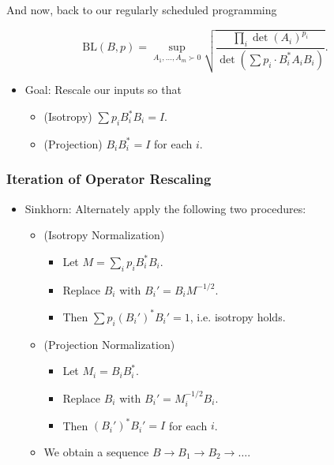\documentclass[usenames,dvipsnames,12pt]{beamer}
\begin{document}
\begin{frame}

And now, back to our regularly scheduled programming

\[ \text{BL}(B,p) = \sup_{A_1,\dots,A_m \succ 0} \sqrt{ \frac{\prod_i \det(A_i)^{p_i}}{\det(\sum p_i \cdot B_i^* A_i B_i)}}. \]

\begin{itemize}
    \pause
    \item Goal: Rescale our inputs so that
    \begin{itemize}
        \pause
        \item (Isotropy) $\sum p_i B_i^* B_i = I$.
        
        \pause
        \item (Projection) $B_i B_i^* = I$ for each $i$.
    \end{itemize}

\end{itemize}

\end{frame}


\begin{frame}
    \frametitle{Iteration of Operator Rescaling}

    \begin{itemize}
    \item Sinkhorn: Alternately apply the following two procedures:
    \begin{itemize}
        \pause
        \item (Isotropy Normalization)
        \begin{itemize}
            \pause
            \item Let $M = \sum_i p_i B_i^* B_i$.
            \pause
            \item Replace $B_i$ with $B_i' = B_i M^{-1/2}$.
            \pause
            \item Then $\sum p_i (B_i')^* B_i' = 1$, i.e. isotropy holds.
        \end{itemize}

        \pause
        \item (Projection Normalization)
        \begin{itemize}
            \pause
            \item Let $M_i = B_i B_i^*$.
            
            \pause
            \item Replace $B_i$ with $B_i' = M_i^{-1/2} B_i$.
            
            \pause
            \item Then $(B_i')^* B_i' = I$ for each $i$.
        \end{itemize}

        \pause
        \item We obtain a sequence $B \to B_1 \to B_2 \to \dots$.
    \end{itemize}
\end{itemize}

\end{frame}
\end{document}

